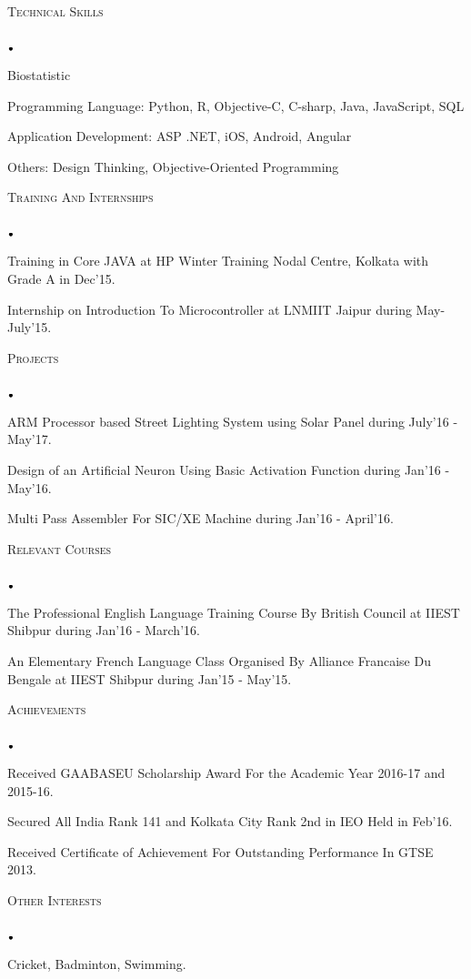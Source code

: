 \documentclass[11pt]{article}
\newcommand{\lineunder}{\vspace*{-8pt} \\ \hspace*{-18pt} \hrulefill \\}
\newcommand{\header}[1]{{\hspace*{-15pt}\vspace*{6pt} \textsc{#1}} \vspace*{-6pt} \lineunder}
\newcommand{\lbt}{\,\begin{picture}(-1,1)(-1,-3)\circle*{3}\end{picture}\ }
\newenvironment{achievements}{
    \begin{list}{$\lbt$}{
        \topsep 0pt
        \itemsep 0pt
        \addtolength{\leftmargin}{-0.1in}
    }
}
{
    \vspace*{4pt}
    \end{list}
}
\begin{document}
\header{Technical Skills}
\vspace{2mm}
\begin{achievements}
\justifying
\item Biostatistic
\item Programming Language: Python, R, Objective-C, C-sharp, Java, JavaScript, SQL
\item Application Development: ASP .NET, iOS, Android, Angular
\item Others: Design Thinking, Objective-Oriented Programming
\end{achievements}
\hfill{}

\header{Training And Internships}
\vspace{2mm}
    \begin{achievements}
\item Training in Core JAVA at HP Winter Training Nodal Centre, Kolkata with Grade A in Dec'15.
    \item Internship on Introduction To Microcontroller at LNMIIT Jaipur during May-July'15.
    \end{achievements}
\hfill{}

\header{Projects}
\vspace{2mm}
    \begin{achievements}
\item ARM Processor based Street Lighting System using Solar Panel during July'16 - May'17.
    \item{Design of an Artificial Neuron Using Basic Activation Function during Jan'16 - May'16.}
    \item Multi Pass Assembler For SIC/XE Machine during Jan'16 - April'16.
    
    \end{achievements}
\hfill{}


\header{Relevant Courses}
\vspace{2mm}

   
     \begin{achievements}
    \item{The Professional English Language Training Course By British Council at IIEST Shibpur during Jan'16 - March'16.}
     \item{An Elementary French Language Class Organised By Alliance Francaise Du Bengale at IIEST Shibpur during Jan'15 - May'15.}
    \end{achievements}
    \hfill{}
   
\header{Achievements}
\vspace{2mm}
\begin{achievements}
\item Received GAABASEU Scholarship Award For the Academic Year 2016-17 and 2015-16.
\item Secured All India Rank 141 and Kolkata City Rank 2nd in IEO Held in Feb'16.
\item Received Certificate of Achievement For Outstanding Performance In GTSE 2013.
\end{achievements}
\hfill{}

\header{Other Interests }
\vspace{2mm}
\begin{achievements}
\justifying
\item Cricket, Badminton, Swimming.
\end{achievements}
\end{document}
